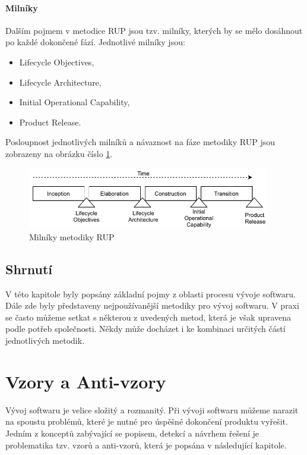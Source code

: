 \documentclass[czech,DP]{thesiskiv}
\begin{document}
\subsubsection{Milníky}
Dalším pojmem v metodice RUP jsou tzv. milníky, kterých by se mělo dosáhnout po každé dokončené fází. Jednotlivé milníky jsou:
\begin{itemize}
    \item Lifecycle Objectives,
    \item Lifecycle Architecture,
    \item Initial Operational Capability,
    \item Product Release.\cite{RUPbook}
\end{itemize}
Posloupnost jednotlivých milníků a návaznost na fáze metodiky RUP jsou zobrazeny na obrázku číslo \ref{img:RUP_milestones}.
\begin{figure}[!htb]
    \centering
    \includegraphics[width=300pt]{img/milestones.pdf}
    \caption{Milníky metodiky RUP}
    \label{img:RUP_milestones}
\end{figure}
\FloatBarrier
\section{Shrnutí}
V této kapitole byly popsány základní pojmy z oblasti procesu vývoje softwaru. Dále zde byly představeny nejpoužívanější metodiky pro vývoj softwaru. V praxi se často můžeme setkat s některou z uvedených metod, která je však upravena podle potřeb společnosti. Někdy může docházet i ke kombinaci určitých částí jednotlivých metodik.

\chapter{Vzory a Anti-vzory}
Vývoj softwaru je velice složitý a rozmanitý. Při vývoji softwaru můžeme narazit na spoustu problémů, které je nutné pro úspěšné dokončení produktu vyřešit. Jedním z konceptů zabývající se popisem, detekcí a návrhem řešení je problematika tzv. vzorů a anti-vzorů, která je popsána v následující kapitole.
\end{document}
